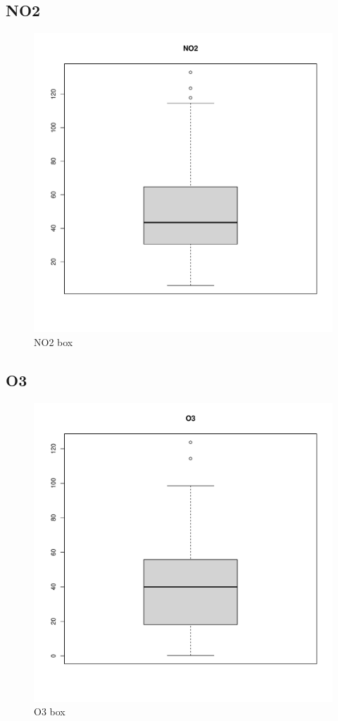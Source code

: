 \documentclass[a4paper,12pt,reqno]{report}
\begin{document}
\subsection{NO2}
\begin{figure}[H]
    \centering
    \vspace{-0.35cm}
    \includegraphics[width=0.7\linewidth]{figures/NO2_box.pdf}
    \caption{NO2 box}
\end{figure}
\subsection{O3}
\begin{figure}[H]
    \centering
    \vspace{-0.35cm}
    \includegraphics[width=0.7\linewidth]{figures/O3_box.pdf}
    \caption{O3 box}
\end{figure}
\end{document}
